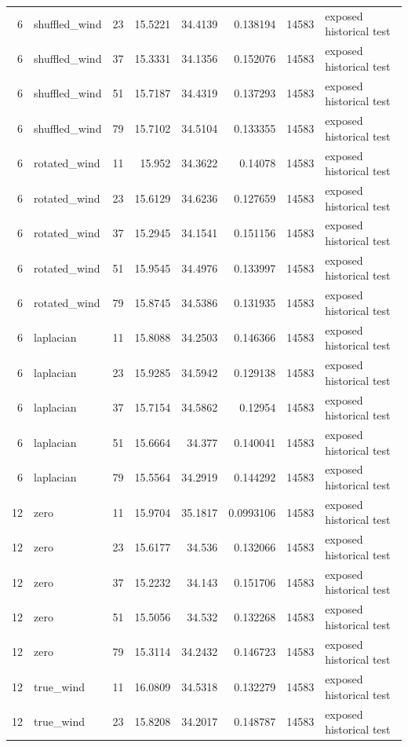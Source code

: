 \begin{tabular}{rllrrrrl}
6 & shuffled\_wind & 23 & 15.5221 & 34.4139 & 0.138194 & 14583 & exposed historical test \\
6 & shuffled\_wind & 37 & 15.3331 & 34.1356 & 0.152076 & 14583 & exposed historical test \\
6 & shuffled\_wind & 51 & 15.7187 & 34.4319 & 0.137293 & 14583 & exposed historical test \\
6 & shuffled\_wind & 79 & 15.7102 & 34.5104 & 0.133355 & 14583 & exposed historical test \\
6 & rotated\_wind & 11 & 15.952 & 34.3622 & 0.14078 & 14583 & exposed historical test \\
6 & rotated\_wind & 23 & 15.6129 & 34.6236 & 0.127659 & 14583 & exposed historical test \\
6 & rotated\_wind & 37 & 15.2945 & 34.1541 & 0.151156 & 14583 & exposed historical test \\
6 & rotated\_wind & 51 & 15.9545 & 34.4976 & 0.133997 & 14583 & exposed historical test \\
6 & rotated\_wind & 79 & 15.8745 & 34.5386 & 0.131935 & 14583 & exposed historical test \\
6 & laplacian & 11 & 15.8088 & 34.2503 & 0.146366 & 14583 & exposed historical test \\
6 & laplacian & 23 & 15.9285 & 34.5942 & 0.129138 & 14583 & exposed historical test \\
6 & laplacian & 37 & 15.7154 & 34.5862 & 0.12954 & 14583 & exposed historical test \\
6 & laplacian & 51 & 15.6664 & 34.377 & 0.140041 & 14583 & exposed historical test \\
6 & laplacian & 79 & 15.5564 & 34.2919 & 0.144292 & 14583 & exposed historical test \\
12 & zero & 11 & 15.9704 & 35.1817 & 0.0993106 & 14583 & exposed historical test \\
12 & zero & 23 & 15.6177 & 34.536 & 0.132066 & 14583 & exposed historical test \\
12 & zero & 37 & 15.2232 & 34.143 & 0.151706 & 14583 & exposed historical test \\
12 & zero & 51 & 15.5056 & 34.532 & 0.132268 & 14583 & exposed historical test \\
12 & zero & 79 & 15.3114 & 34.2432 & 0.146723 & 14583 & exposed historical test \\
12 & true\_wind & 11 & 16.0809 & 34.5318 & 0.132279 & 14583 & exposed historical test \\
12 & true\_wind & 23 & 15.8208 & 34.2017 & 0.148787 & 14583 & exposed historical test \\

\end{tabular}
